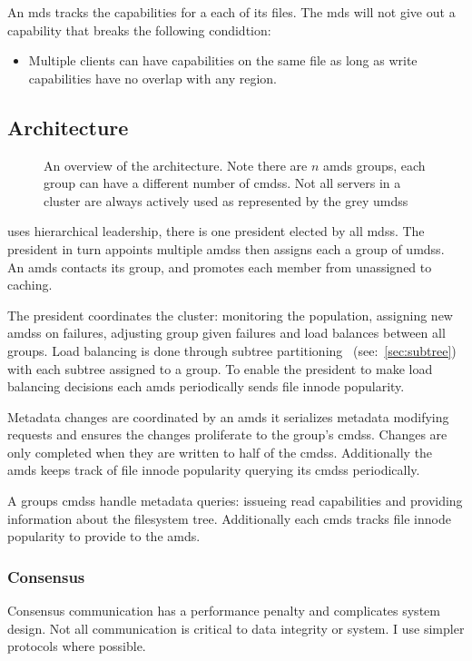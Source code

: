 \begin{samepage}
An \ac{mds} tracks the capabilities for a each of its files. The \ac{mds} will not give out a capability that breaks the following condidtion:
%
\begin{itemize}
	\item Multiple clients can have capabilities on the same file as long as write capabilities have no overlap with any region.
\end{itemize}
\end{samepage}
% 
\subsection{Architecture}
\begin{figure}
	
	\caption{An overview of the architecture. Note there are $n$ \acf{amds} groups, each group can have a different number of \acfp{cmds}. Not all servers in a cluster are always actively used as represented by the grey \acfp{umds}}
\end{figure}

\Name{} uses hierarchical leadership, there is one president elected by all \acp{mds}. The president in turn appoints multiple \acfp{amds} then assigns each a group of \acfp{umds}. An \ac{amds} contacts its group, and promotes each member from unassigned to caching. 

The president coordinates the cluster: monitoring the population, assigning new \acp{amds} on failures, adjusting group given failures and load balances between all groups. Load balancing is done through subtree partitioning~\cite{ceph} (see:~\cref{sec:subtree}) with each subtree assigned to a group. To enable the president to make load balancing decisions each \ac{amds} periodically sends file innode popularity.

Metadata changes are coordinated by an \ac{amds} it serializes metadata modifying requests and ensures the changes proliferate to the group's \acp{cmds}. Changes are only completed when they are written to half of the \acp{cmds}. Additionally the \ac{amds} keeps track of file innode popularity querying its \acp{cmds} periodically.

A groups \acp{cmds} handle metadata queries: issueing read capabilities and providing information about the filesystem tree. Additionally each \ac{cmds} tracks file innode popularity to provide to the \ac{amds}. 
%
\subsubsection*{Consensus}
Consensus communication has a performance penalty and complicates system design. Not all communication is critical to data integrity or system. I use simpler protocols where possible. 

